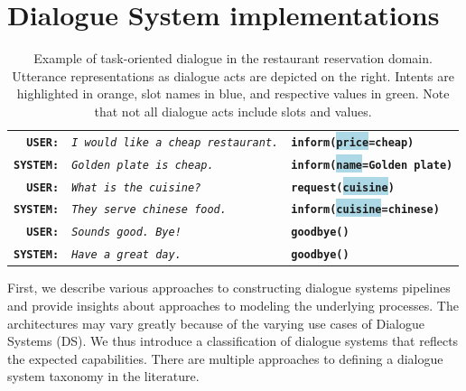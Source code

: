 \section{Dialogue System implementations}
\label{02:ds-background}
\begin{table}[tp]
\small
\setlength\fboxsep{2pt}
        \centering
        \begin{tabular}{rll}
        \textbf{\texttt{USER:}} & \textit{\texttt{I would like a cheap restaurant.}} & \textbf{\texttt{\colorbox{pastelyellow}{inform}(\colorbox{lightblue}{price}=\colorbox{pastelgreen}{cheap})}} \\
        \textbf{\texttt{SYSTEM:}} & \textit{\texttt{Golden plate is cheap.}} & \textbf{\texttt{\colorbox{pastelyellow}{inform}(\colorbox{lightblue}{name}=\colorbox{pastelgreen}{Golden plate})}} \\
        \hdashline[1.5pt/2pt]
        \textbf{\texttt{USER:}} & \textit{\texttt{What is the cuisine?}} & \textbf{\texttt{\colorbox{pastelyellow}{request}(\colorbox{lightblue}{cuisine})}} \\
        \textbf{\texttt{SYSTEM:}} & \textit{\texttt{They serve chinese food.}} & \textbf{\texttt{\colorbox{pastelyellow}{inform}(\colorbox{lightblue}{cuisine}=\colorbox{pastelgreen}{chinese})}} \\
        \hdashline[1.5pt/2pt]
        \textbf{\texttt{USER:}} & \textit{\texttt{Sounds good. Bye!}} & \textbf{\texttt{\colorbox{pastelyellow}{goodbye}()}} \\
        \textbf{\texttt{SYSTEM:}} & \textit{\texttt{Have a great day.}} & \textbf{\texttt{\colorbox{pastelyellow}{goodbye}()}} \\
        \end{tabular}
\normalsize
        \caption{Example of task-oriented dialogue in the restaurant reservation domain. Utterance representations as dialogue acts are depicted on the right. Intents are highlighted in orange, slot names in blue, and respective values in green. Note that not all dialogue acts include slots and values.}
    \label{fig:das}
\end{table}
First, we describe various approaches to constructing dialogue systems pipelines and provide insights about approaches to modeling the underlying processes.
The architectures may vary greatly because of the varying use cases of Dialogue Systems (DS).
We thus introduce a classification of dialogue systems that reflects the expected capabilities.
There are multiple approaches to defining a dialogue system taxonomy in the literature.
